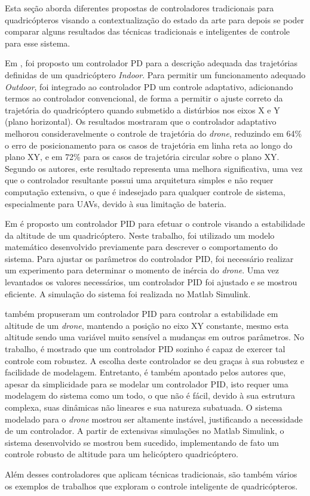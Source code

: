 Esta seção aborda diferentes propostas de controladores tradicionais para quadricópteros visando a contextualização do estado da arte para depois se poder comparar alguns resultados das técnicas tradicionais e inteligentes de controle para esse sistema.

Em \cite{Razinkova2014}, foi proposto um controlador PD para a descrição adequada das trajetórias definidas de um quadricóptero \textit{Indoor}. Para permitir um funcionamento adequado \textit{Outdoor}, foi integrado ao controlador PD um controle adaptativo, adicionando termos ao controlador convencional, de forma a permitir o ajuste correto da trajetória do quadricóptero quando submetido a distúrbios nos eixos X e Y (plano horizontal). Os resultados mostraram que o controlador adaptativo melhorou consideravelmente o controle de trajetória do \textit{drone}, reduzindo em 64\% o erro de posicionamento para os casos de trajetória em linha reta ao longo do plano XY, e em 72\% para os casos de trajetória circular sobre o plano XY. Segundo os autores, este resultado representa uma melhora significativa, uma vez que o controlador resultante possui uma arquitetura simples e não requer computação extensiva, o que é indesejado para qualquer controle de sistema, especialmente para UAVs, devido à sua limitação de bateria.

Em \cite{Mustapa2014} é proposto um controlador PID para efetuar o controle visando a estabilidade da altitude de um quadricóptero. Neste trabalho, foi utilizado um modelo matemático desenvolvido previamente para descrever o comportamento do sistema. Para ajustar os parâmetros do controlador PID, foi necessário realizar um experimento para determinar o momento de inércia do \textit{drone}. Uma vez levantados os valores necessários, um controlador PID foi ajustado e se mostrou eficiente. A simulação do sistema foi realizada no Matlab\textsuperscript{\textregistered} Simulink\textsuperscript{\textregistered}.

 também propuseram um controlador PID para controlar a estabilidade em altitude de um \textit{drone}, mantendo a posição no eixo XY constante, mesmo esta altitude sendo uma variável muito sensível a mudanças em outros parâmetros. No trabalho, é mostrado que um controlador PID sozinho é capaz de exercer tal controle com robustez. A escolha deste controlador se deu graças à sua robustez e facilidade de modelagem. Entretanto, é também apontado pelos autores que, apesar da simplicidade para se modelar um controlador PID, isto requer uma modelagem do sistema como um todo, o que não é fácil, devido à sua estrutura complexa, suas dinâmicas não lineares e sua natureza subatuada. O sistema modelado para o \textit{drone} mostrou ser altamente instável, justificando a necessidade de um controlador. A partir de extensivas simulações no Matlab\textsuperscript{\textregistered} Simulink\textsuperscript{\textregistered}, o sistema desenvolvido se mostrou bem sucedido, implementando de fato um controle robusto de altitude para um helicóptero quadricóptero.

Além desses controladores que aplicam técnicas tradicionais, são também vários os exemplos de trabalhos que exploram o controle inteligente de quadricópteros.